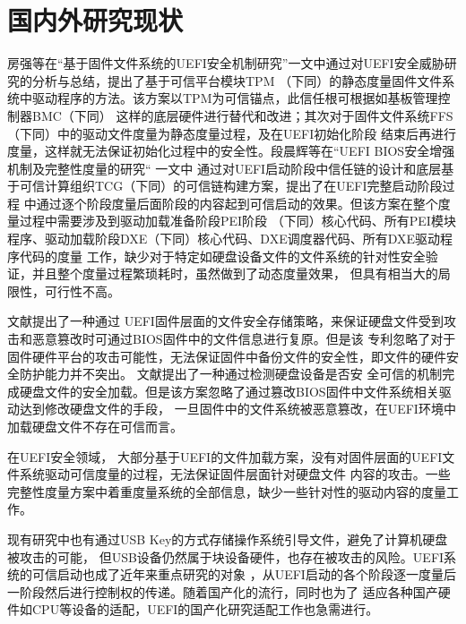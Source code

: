 \section{国内外研究现状}
房强等在“基于固件文件系统的UEFI安全机制研究”一文中通过对UEFI安全威胁研究的分析与总结\cite{chinese11}，提出了基于可信平台模块TPM
（下同）的静态度量固件文件系统中驱动程序的方法。该方案以TPM为可信锚点，此信任根可根据如基板管理控制器BMC（下同）
这样的底层硬件进行替代和改进；其次对于固件文件系统FFS（下同）中的驱动文件度量为静态度量过程，及在UEFI初始化阶段
结束后再进行度量，这样就无法保证初始化过程中的安全性。段晨辉等在“UEFI BIOS安全增强机制及完整性度量的研究“
\cite{chinese8}一文中
通过对UEFI启动阶段中信任链的设计和底层基于可信计算组织TCG（下同）的可信链构建方案，提出了在UEFI完整启动阶段过程
中通过逐个阶段度量后面阶段的内容起到可信启动的效果。但该方案在整个度量过程中需要涉及到驱动加载准备阶段PEI阶段
（下同）核心代码、所有PEI模块程序、驱动加载阶段DXE（下同）核心代码、DXE调度器代码、所有DXE驱动程序代码的度量
工作，缺少对于特定如硬盘设备文件的文件系统的针对性安全验证，并且整个度量过程繁琐耗时，虽然做到了动态度量效果，
但具有相当大的局限性，可行性不高。
\par 文献提出了一种通过
UEFI固件层面的文件安全存储策略，来保证硬盘文件受到攻击和恶意篡改时可通过BIOS固件中的文件信息进行复原。但是该
专利忽略了对于固件硬件平台的攻击可能性，无法保证固件中备份文件的安全性，即文件的硬件安全防护能力并不突出。
文献提出了一种通过检测硬盘设备是否安
全可信的机制完成硬盘文件的安全加载。但是该方案忽略了通过篡改BIOS固件中文件系统相关驱动达到修改硬盘文件的手段，
一旦固件中的文件系统被恶意篡改，在UEFI环境中加载硬盘文件不存在可信而言。
\par 在UEFI安全领域\cite{english9,english10,english11}，
大部分基于UEFI的文件加载方案，没有对固件层面的UEFI文件系统驱动可信度量的过程，无法保证固件层面针对硬盘文件
内容的攻击。一些完整性度量方案中着重度量系统的全部信息，缺少一些针对性的驱动内容的度量工作\cite{english4}。
\par 现有研究中也有通过USB Key的方式存储操作系统引导文件\cite{english15}，避免了计算机硬盘被攻击的可能，
但USB设备仍然属于块设备硬件，也存在被攻击的风险。UEFI系统的可信启动也成了近年来重点研究的对象\cite{english8,english14}
，从UEFI启动的各个阶段逐一度量后一阶段然后进行控制权的传递。随着国产化的流行\cite{english19}，同时也为了
适应各种国产硬件如CPU等设备的适配，UEFI的国产化研究适配工作也急需进行。

%
%
